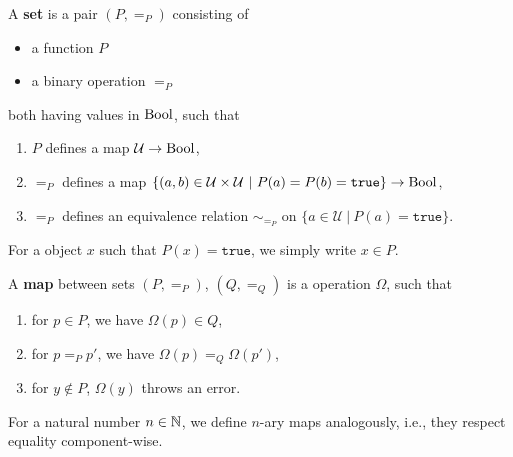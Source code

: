 \begin{definition}
 A \textbf{\GAP set} is a pair $(P, =_P)$ consisting of
 \begin{itemize}
  \item a \GAP function $P$
  \item a binary \GAP operation $=_P$
 \end{itemize}
both having values in $\mathrm{Bool}$, such that
\begin{enumerate}
 \item $P$ defines a map $\mathcal{U} \rightarrow \mathrm{Bool}$,
 \item $=_P$ defines a map $\{ ( a,b ) \in \mathcal{U} \times \mathcal{U} ~|~ P(a) = P(b) = \texttt{true} \} \rightarrow \mathrm{Bool}$,
 \item $=_P$ defines an equivalence relation $\sim_{=_P}$ on $\{ a \in \mathcal{U} ~|~ P(a) = \texttt{true} \}$.
\end{enumerate}
\end{definition}

\begin{notation}
 For a \GAP object $x$ such that $P(x) = \texttt{true}$, we simply write $x \in P$.
\end{notation}

\begin{definition}
 A \textbf{\GAP map} between \GAP sets $(P, =_P)$, $(Q, =_Q)$ is a \GAP operation $\Omega$, such that
 \begin{enumerate}
  \item for $p \in P$, we have $\Omega( p ) \in Q$,
  \item for $p =_P p'$, we have $\Omega( p ) =_Q \Omega( p')$,
  \item for $y \not\in P$, $\Omega( y )$ throws an error.
 \end{enumerate}
 For a natural number $n \in \mathbb{N}$, we define $n$-ary \GAP maps analogously, i.e., 
 they respect equality component-wise.
\end{definition}

